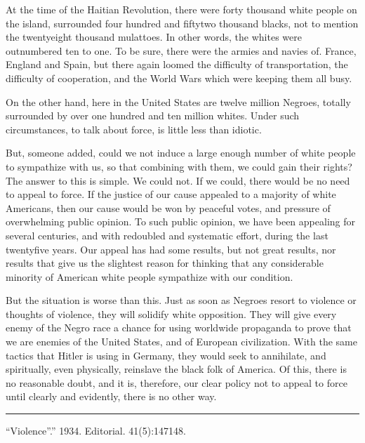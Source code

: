 \documentclass[letterpaper,10pt,english]{jupyterBook}
\begin{document}
\sphinxAtStartPar
At the time of the Haitian Revolution, there were forty thousand white people on the island, surrounded four hundred and fifty\sphinxhyphen{}two thousand blacks, not to mention the twenty\sphinxhyphen{}eight thousand mulattoes. In other words, the whites were outnumbered ten to one. To be sure, there were the armies and navies of. France, England and Spain, but there again loomed the difficulty of transportation, the difficulty of co\sphinxhyphen{}operation, and the World Wars which were keeping them all busy.

\sphinxAtStartPar
On the other hand, here in the United States are twelve million Negroes, totally surrounded by over one hundred and ten million whites. Under such circumstances, to talk about force, is little less than idiotic.

\sphinxAtStartPar
But, someone added, could we not induce a large enough number of white people to sympathize with us, so that combining with them, we could gain their rights? The answer to this is simple. We could not. If we could, there would be no need to appeal to force. If the justice of our cause appealed to a majority of white Americans, then our cause would be won by peaceful votes, and pressure of overwhelming public opinion. To such public opinion, we have been appealing for several centuries, and with redoubled and systematic effort, during the last twenty\sphinxhyphen{}five years. Our appeal has had some results, but not great results, nor results that give us the slightest reason for thinking that any considerable minority of American white people sympathize with our condition.

\sphinxAtStartPar
But the situation is worse than this. Just as soon as Negroes resort to violence or thoughts of violence, they will solidify white opposition. They will give every enemy of the Negro race a chance for using world\sphinxhyphen{}wide propaganda to prove that we are enemies of the United States, and of European civilization. With the same tactics that Hitler is using in Germany, they would seek to annihilate, and spiritually, even physically, reinslave the black folk of America. Of this, there is no reasonable doubt, and it is, therefore, our clear policy not to appeal to force until clearly and evidently, there is no other way.


\bigskip\hrule\bigskip


\sphinxAtStartPar
{} “Violence”.” 1934. Editorial.  41(5):147\sphinxhyphen{}148.
\end{document}
